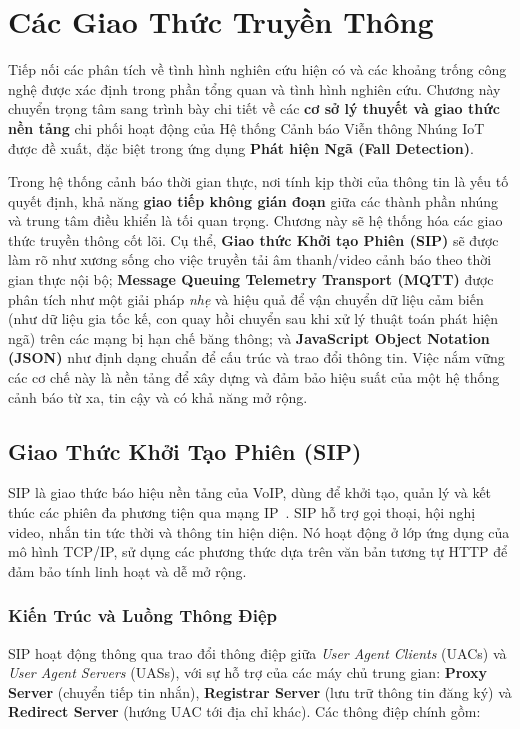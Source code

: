 \section{Các Giao Thức Truyền Thông}
\label{sec:communication_protocols}
Tiếp nối các phân tích về tình hình nghiên cứu hiện có và các khoảng trống công nghệ được xác định trong phần tổng quan và tình hình nghiên cứu. Chương này chuyển trọng tâm sang trình bày chi tiết về các \textbf{cơ sở lý thuyết và giao thức nền tảng} chi phối hoạt động của Hệ thống Cảnh báo Viễn thông Nhúng IoT được đề xuất, đặc biệt trong ứng dụng \textbf{Phát hiện Ngã (Fall Detection)}.

Trong hệ thống cảnh báo thời gian thực, nơi tính kịp thời của thông tin là yếu tố quyết định, khả năng \textbf{giao tiếp không gián đoạn} giữa các thành phần nhúng và trung tâm điều khiển là tối quan trọng. Chương này sẽ hệ thống hóa các giao thức truyền thông cốt lõi. Cụ thể, \textbf{Giao thức Khởi tạo Phiên (SIP)} sẽ được làm rõ như xương sống cho việc truyền tải âm thanh/video cảnh báo theo thời gian thực nội bộ; \textbf{Message Queuing Telemetry Transport (MQTT)} được phân tích như một giải pháp \textit{nhẹ} và hiệu quả để vận chuyển dữ liệu cảm biến (như dữ liệu gia tốc kế, con quay hồi chuyển sau khi xử lý thuật toán phát hiện ngã) trên các mạng bị hạn chế băng thông; và \textbf{JavaScript Object Notation (JSON)} như định dạng chuẩn để cấu trúc và trao đổi thông tin. Việc nắm vững các cơ chế này là nền tảng để xây dựng và đảm bảo hiệu suất của một hệ thống cảnh báo từ xa, tin cậy và có khả năng mở rộng.
\subsection{Giao Thức Khởi Tạo Phiên (SIP)}
\label{subsec:sip_protocol}

SIP là giao thức báo hiệu nền tảng của VoIP, dùng để khởi tạo, quản lý và kết thúc các phiên đa phương tiện qua mạng IP~\cite{sip_rfc3261}. SIP hỗ trợ gọi thoại, hội nghị video, nhắn tin tức thời và thông tin hiện diện. Nó hoạt động ở lớp ứng dụng của mô hình TCP/IP, sử dụng các phương thức dựa trên văn bản tương tự HTTP để đảm bảo tính linh hoạt và dễ mở rộng.

\subsubsection{Kiến Trúc và Luồng Thông Điệp}
\label{subsubsec:sip_architecture}

SIP hoạt động thông qua trao đổi thông điệp giữa \textit{User Agent Clients} (UACs) và \textit{User Agent Servers} (UASs), với sự hỗ trợ của các máy chủ trung gian: \textbf{Proxy Server} (chuyển tiếp tin nhắn), \textbf{Registrar Server} (lưu trữ thông tin đăng ký) và \textbf{Redirect Server} (hướng UAC tới địa chỉ khác). Các thông điệp chính gồm:


